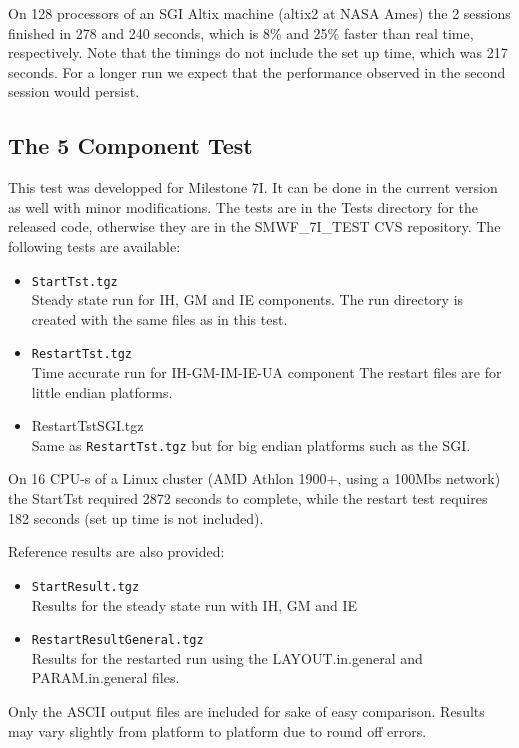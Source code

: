 On 128 processors of an SGI Altix machine (altix2 at NASA Ames) 
the 2 sessions finished in 278 and 240 seconds, 
which is 8\% and 25\% faster than real time, respectively.
Note that the timings do not include the set up time, which was 217 seconds.
For a longer run we expect that the performance observed in the
second session would persist.

\subsection{The 5 Component Test}

This test was developped for Milestone 7I. 
It can be done in the current version as well with minor
modifications. 
The tests are in the Tests directory for the released code, otherwise
they are in the SMWF\_7I\_TEST CVS repository.  The following tests
are available:
\begin{itemize}
\item {\tt StartTst.tgz}\\
      Steady state run for IH, GM and IE components.
      The run directory is created with the same files as in
      this test.

\item {\tt RestartTst.tgz}\\
      Time accurate run for IH-GM-IM-IE-UA component
      The restart files are for little endian platforms.

\item {RestartTstSGI.tgz}\\
      Same as {\tt RestartTst.tgz} 
      but for big endian platforms such as the SGI.
\end{itemize}
On 16 CPU-s of a Linux cluster (AMD Athlon 1900+, using a 100Mbs
network) the StartTst required 2872 seconds to complete, while the
restart test requires 182 seconds (set up time is not included).

Reference results are also  provided:
\begin{itemize}
\item {\tt StartResult.tgz}\\
       Results for the steady state run with IH, GM and IE

\item {\tt RestartResultGeneral.tgz}\\
      Results for the restarted run using the 
      LAYOUT.in.general and PARAM.in.general files.
\end{itemize}
Only the ASCII output files are included for sake of easy comparison.
Results may vary slightly from platform to platform due to round off errors.


